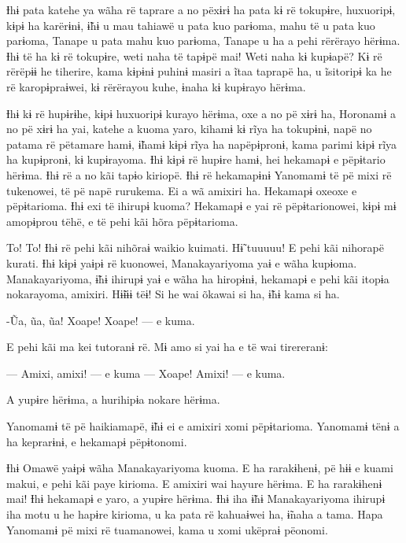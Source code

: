  

 

Ɨhɨ pata katehe ya wãha rë taprare a no pëxɨrɨ ha pata kɨ rë tokupɨre,
huxuoripɨ, kɨpɨ ha karërɨnɨ, ɨ̃hɨ u mau tahiawë u pata kuo parɨoma, mahu
të u pata kuo parɨoma, Tanape u pata mahu kuo parɨoma, Tanape u ha a
pehi rërërayo hërɨma. Ɨhɨ të ha kɨ rë tokupɨre, weti naha të tapɨpë mai!
Weti naha kɨ kupɨapë? Kɨ rë rërëpɨɨ he tiherire, kama kɨpɨnɨ puhinɨ
masiri a ĩtaa taprapë ha, u ĩsitoripɨ ka he rë karopɨpraɨwei, kɨ
rërërayou kuhe, ɨnaha kɨ kupɨrayo hërɨma. 

Ɨhɨ kɨ rë hupɨrɨhe, kɨpɨ huxuoripɨ kurayo hërɨma, oxe a no pë xɨrɨ ha,
Horonamɨ a no pë xɨrɨ ha yai, katehe a kuoma yaro, kihamɨ kɨ rĩya ha
tokupɨnɨ, napë no patama rë pëtamare hamɨ, ɨ̃hamɨ kɨpɨ rĩya ha
napëpɨpronɨ, kama parimi kɨpɨ rĩya ha kupɨpronɨ, kɨ kupɨrayoma. Ɨhɨ kɨpɨ
rë hupɨre hamɨ, hei hekamapɨ e pëpɨtario hërɨma. Ɨhɨ rë a no kãi tapɨo
kiriopë. Ɨhɨ rë hekamapɨnɨ Yanomamɨ të pë mixi rë tukenowei, të pë napë
rurukema. Ei a wã amixiri ha. Hekamapɨ oxeoxe e pëpɨtarioma. Ɨhɨ exi të
ihirupɨ kuoma? Hekamapɨ e yai rë pëpɨtarionowei, kɨpɨ mɨ amopɨprou tëhë,
e të pehi kãi hõra pëpɨtarioma. 

To! To! Ɨhɨ rë pehi kãi nihõraɨ waikio kuimati. Hɨ̃ tuuuuu! E pehi kãi
nihorapë kurati. Ɨhɨ kɨpɨ yaɨpɨ rë kuonowei, Manakayariyoma yaɨ e wãha
kupɨoma. Manakayariyoma, ɨ̃hɨ ihirupɨ yaɨ e wãha ha hiropɨnɨ, hekamapɨ e
pehi kãi itopɨa nokarayoma, amixiri. Hɨ̃ɨɨɨ tëɨ! Si he wai õkawai si ha,
ɨ̃hɨ kama si ha. 

-Ũa, ũa, ũa! Xoape! Xoape! --- e kuma. 

E pehi kãi ma kei tutoranɨ rë. Mɨ amo si yai ha e të wai tirereranɨ:

— Amixi, amixi! --- e kuma --- Xoape! Amixi! --- e kuma. 

A yupɨre hërɨma, a hurihipɨa nokare hërɨma. 

Yanomamɨ të pë haikiamapë, ɨ̃hɨ ei e amixiri xomi pëpɨtarioma. Yanomamɨ
tënɨ a ha keprarɨnɨ, e hekamapɨ pëpɨtonomi. 

Ɨhɨ Omawë yaɨpɨ wãha Manakayariyoma kuoma. E ha rarakɨhenɨ, pë hɨɨ e
kuami makui, e pehi kãi paye kirioma. E amixiri wai hayure hërɨma. E ha
rarakɨhenɨ mai! Ɨhɨ hekamapɨ e yaro, a yupɨre hërɨma. Ɨhɨ iha ɨ̃hɨ
Manakayariyoma ihirupɨ iha motu u he hapɨre kirioma, u ka pata rë
kahuaɨwei ha, ɨ̃naha a tama. Hapa Yanomamɨ pë mixi rë tuamanowei, kama u
xomi ukëpraɨ pëonomi. 

